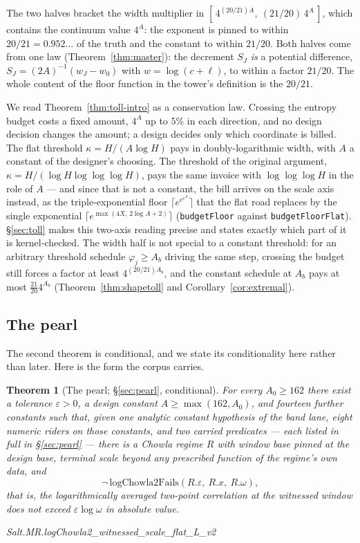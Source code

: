 \documentclass[11pt]{amsart}
\newcommand{\leanname}[1]{\par{\noindent\small\ttfamily\raggedright #1\par}}
\newcommand{\leaninline}[1]{{\small\texttt{#1}}}
\newtheorem{theorem}{Theorem}[section]
\theoremstyle{remark}
\begin{document}
The two halves bracket the width multiplier in
$[\,4^{(20/21)A},\ (21/20)\,4^{A}\,]$, which contains the continuum value
$4^{A}$: the exponent is pinned to within $20/21 = 0.952\ldots$ of the
truth and the constant to within $21/20$. Both halves come from one law
(Theorem~\ref{thm:master}): the decrement $S_J$ \emph{is} a potential
difference, $S_J = (2A)^{-1}(w_J - w_0)$ with $w = \log(c+\ell)$, to
within a factor $21/20$. The whole content of the floor function in the
tower's definition is the $20/21$.

We read Theorem~\ref{thm:toll-intro} as a conservation law. Crossing the
entropy budget costs a fixed amount, $4^{A}$ up to $5\%$ in each direction,
and no design decision changes the amount; a design decides only which
coordinate is billed. The flat threshold $\kappa = H/(A\log H)$ pays in
doubly-logarithmic width, with $A$ a constant of the designer's choosing.
The threshold of the original argument, $\kappa = H/(\log H\log\log\log H)$,
pays the same invoice with $\log\log\log H$ in the role of $A$ --- and
since that is not a constant, the bill arrives on the scale axis instead,
as the triple-exponential floor $\lceil e^{e^{e^{X}}}\rceil$ that the flat
road replaces by the single exponential
$\lceil e^{\max(4X,\,2\log A + 2)}\rceil$
(\leaninline{budgetFloor} against \leaninline{budgetFloorFlat}). \S\ref{sec:toll}
makes this two-axis reading precise and states exactly which part of it is
kernel-checked. The width half is not special to a constant threshold: for an
arbitrary threshold schedule $\varphi_j \ge A_b$ driving the same step, crossing
the budget still forces a factor at least $4^{(20/21)A_b}$, and the constant
schedule at $A_b$ pays at most $\frac{21}{20}4^{A_b}$
(Theorem~\ref{thm:shapetoll} and Corollary~\ref{cor:extremal}).

\subsection{The pearl}
The second theorem is conditional, and we state its conditionality here
rather than later. Here is the form the corpus carries.

\begin{theorem}[The pearl; \S\ref{sec:pearl}, conditional]\label{thm:pearl-intro}
For every $A_0 \ge 162$ there exist a tolerance $\varepsilon > 0$, a
design constant $A \ge \max(162, A_0)$, and fourteen further constants
such that, \emph{given} one analytic constant hypothesis of the band
lane, eight numeric riders on those constants, and two carried
predicates --- each listed in full in \S\ref{sec:pearl} --- there is a
Chowla regime $R$ with window base pinned at the design base,
terminal scale beyond any prescribed function of the regime's own data,
and
\[
\lnot\,\mathrm{logChowla2Fails}(R.\varepsilon,\ R.x,\ R.\omega),
\]
that is, the logarithmically averaged two-point correlation at the
witnessed window does not exceed $\varepsilon\log\omega$ in absolute
value.
\leanname{Salt.MR.logChowla2\_witnessed\_scale\_flat\_L\_v2}
\end{theorem}
\end{document}

